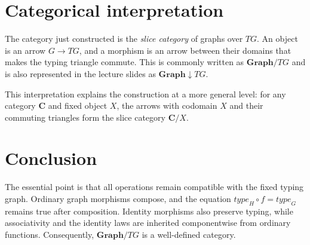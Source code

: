 \documentclass[10pt,a4paper]{article}
\theoremstyle{definition}
\newcommand{\Graph}{\mathbf{Graph}}
\newcommand{\TG}{\mathit{TG}}
\newcommand{\type}{\mathit{type}}
\begin{document}
\section{Categorical interpretation}

The category just constructed is the \emph{slice category} of graphs over
$\TG$. An object is an arrow $G\to\TG$, and a morphism is an arrow between
their domains that makes the typing triangle commute. This is commonly written
as $\Graph/\TG$ and is also represented in the lecture slides as
$\Graph\downarrow\TG$.

This interpretation explains the construction at a more general level: for
any category $\mathbf{C}$ and fixed object $X$, the arrows with codomain $X$
and their commuting triangles form the slice category $\mathbf{C}/X$.

\section{Conclusion}

The essential point is that all operations remain compatible with the fixed
typing graph. Ordinary graph morphisms compose, and the equation
$\type_H\circ f=\type_G$ remains true after composition. Identity morphisms
also preserve typing, while associativity and the identity laws are inherited
componentwise from ordinary functions. Consequently, $\Graph/\TG$ is a
well-defined category.
\end{document}
